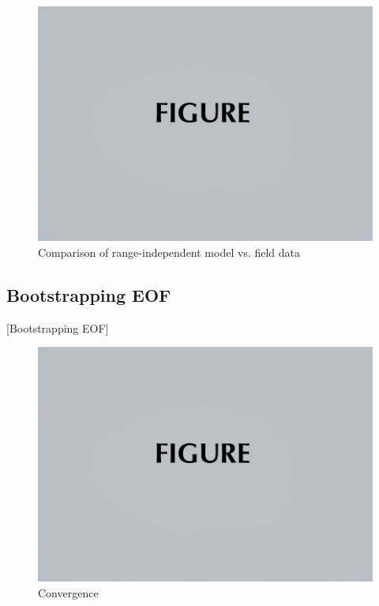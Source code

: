 \begin{figure}[ht]
\includegraphics[width=\reprintcolumnwidth]{figsamp.jpg}
\caption{\label{fig:FIG5}{Comparison of range-independent model vs. field data}}
\end{figure}

\subsection{\label{subsec:4:2} Bootstrapping EOF}
{\color{red}[Bootstrapping EOF]}

\begin{figure}[ht]
\includegraphics[width=\reprintcolumnwidth]{figsamp.jpg}
\caption{\label{fig:FIG6}{Convergence}}
\end{figure}

